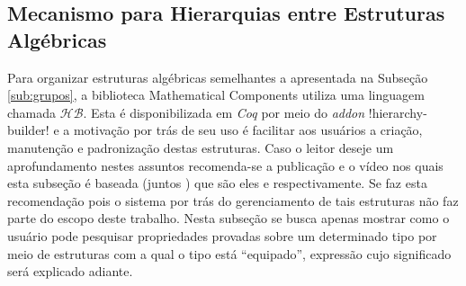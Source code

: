 \subsection{Mecanismo para Hierarquias entre Estruturas Algébricas}

Para organizar estruturas algébricas semelhantes a apresentada na Subseção \ref{sub:grupos}, a biblioteca Mathematical Components utiliza uma linguagem chamada $\mathcal{HB}$. Esta é disponibilizada em \textit{Coq} por meio do \textit{addon} \coqinline!hierarchy-builder! e a motivação por trás de seu uso é facilitar aos usuários a criação, manutenção e padronização destas estruturas. Caso o leitor deseje um aprofundamento nestes assuntos recomenda-se a publicação e o vídeo nos quais esta subseção é baseada (juntos \cite{assia_mahboubi_2022_7118596}) que são eles \cite{cohen:hal-02478907} e \cite{youtuCohen} respectivamente. Se faz esta recomendação pois o sistema por trás do gerenciamento de tais estruturas não faz parte do escopo deste trabalho. Nesta subseção se busca apenas mostrar como o usuário pode pesquisar propriedades provadas sobre um determinado tipo por meio de estruturas com a qual o tipo está ``equipado'', expressão cujo significado será explicado adiante.


